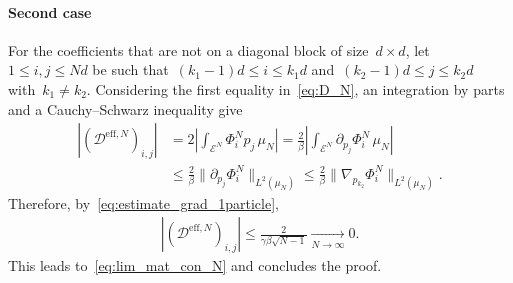 \documentclass[onefignum,onetabnum]{siamart251216} %
\newcommand{\mc}[1]{\mathcal{#1}}
\renewcommand{\leq}{\leqslant}
\newcommand{\mescin}{\mu}
\newcommand{\DeffN}{\mc{D}^{\mathrm{eff},N}}
\theoremstyle{plain}
\numberwithin{equation}{section}
\numberwithin{theorem}{section}
\begin{document}
\paragraph{Second case}
For the coefficients that are not on a diagonal block of size~$d \times d$, let~$1\leq i,j\leq Nd$ be such that~$(k_1-1)d \leq i \leq k_1d$ and~$(k_2-1)d \leq j \leq k_2d$ with~$k_1 \neq k_2$.
Considering the first equality in~\eqref{eq:D_N},
an integration by parts and a Cauchy--Schwarz inequality give
\begin{align*}
    \left|(\DeffN)_{i,j}\right|
    &= 2\left|\int_{\mc{E}^N}\Phi_i^N  p_j \,\mescin_N\right|
    =  \frac{2}{\beta}\left|\int_{\mc{E}^N}\partial_{p_j}\Phi_i^N \,\mescin_N\right|\\
    & \leq \frac{2}{\beta}\|\partial_{p_j}\Phi_i^N\|_{L^2(\mescin_N)} \leq \frac{2}{\beta}\|\nabla_{p_{k_2}}\Phi_i^N\|_{L^2(\mescin_N)}.
\end{align*}
Therefore, by~\eqref{eq:estimate_grad_1particle},
\begin{align*}
    \left|(\DeffN)_{i,j}\right| \leq \frac{2}{\gamma\beta\sqrt{N-1}} \xrightarrow[N\rightarrow\infty]{} 0.
\end{align*}
This leads to~\eqref{eq:lim_mat_con_N} and concludes the proof.

%
%
\end{document}
